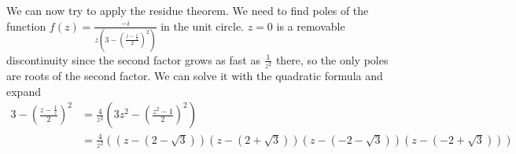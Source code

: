 \documentclass{homework}
\begin{document}
\begin{solution}
                                                                                       We can now try to apply the residue theorem. We need to find poles of the function 
                                                                                       $f(z) = \frac{-i}{z(3 - (\frac{z - \frac{1}{z}}{2})^2)}$ in the unit circle.
                                                                                       $z=0$ is a removable discontinuity since the second factor grows as fast as $\frac{1}{z^2}$ there, so the only poles are roots of the second factor. We can solve it with the quadratic formula and expand
                                                                                       \begin{align*}
                                                                                       3 - (\frac{z - \frac{1}{z}}{2})^2 &= 
                                                                                       \frac{4}{z^2}\left(3z^2 - (\frac{z^2 - 1}{2})^2\right)\\
                                                                                       &= \frac{4}{z^2}\left(  (z-(2-\sqrt{3}))(z-(2+\sqrt{3}))(z-(-2-\sqrt{3}))(z-(-2+\sqrt{3}))\right)
                                                                                       \end{align*}


\end{solution}
\end{document}
